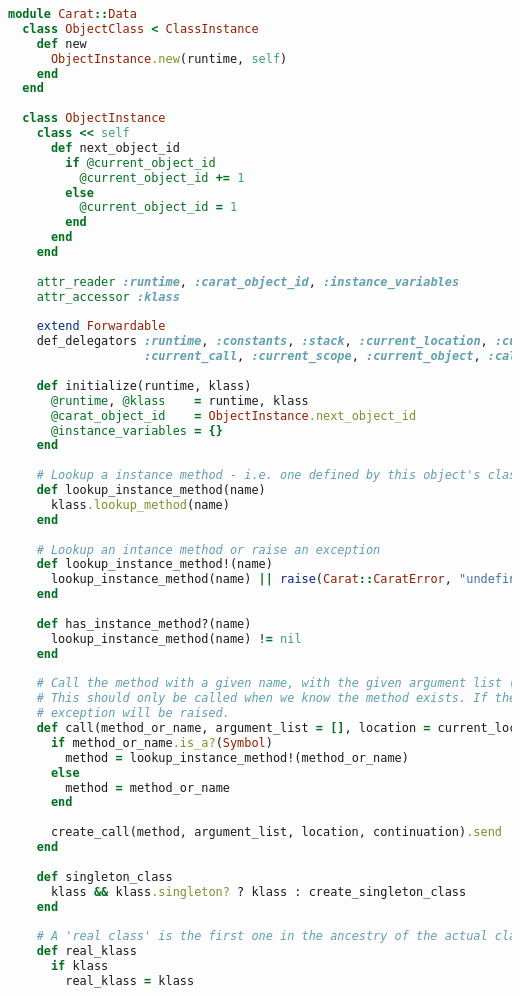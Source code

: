 \begin{lstlisting}[title={\small\ttfamily\bfseries data/object.rb},language=Ruby]
module Carat::Data
  class ObjectClass < ClassInstance
    def new
      ObjectInstance.new(runtime, self)
    end
  end
  
  class ObjectInstance
    class << self
      def next_object_id
        if @current_object_id
          @current_object_id += 1
        else
          @current_object_id = 1
        end
      end
    end
    
    attr_reader :runtime, :carat_object_id, :instance_variables
    attr_accessor :klass
    
    extend Forwardable
    def_delegators :runtime, :constants, :stack, :current_location, :current_failure_continuation,
                   :current_call, :current_scope, :current_object, :call_stack
    
    def initialize(runtime, klass)
      @runtime, @klass    = runtime, klass
      @carat_object_id    = ObjectInstance.next_object_id
      @instance_variables = {}
    end
    
    # Lookup a instance method - i.e. one defined by this object's class
    def lookup_instance_method(name)
      klass.lookup_method(name)
    end
    
    # Lookup an intance method or raise an exception
    def lookup_instance_method!(name)
      lookup_instance_method(name) || raise(Carat::CaratError, "undefined method '#{name}'")
    end
    
    def has_instance_method?(name)
      lookup_instance_method(name) != nil
    end
    
    # Call the method with a given name, with the given argument list (AST::ArgumentList or Array).
    # This should only be called when we know the method exists. If the method does not exist an
    # exception will be raised.
    def call(method_or_name, argument_list = [], location = current_location, &continuation)
      if method_or_name.is_a?(Symbol)
        method = lookup_instance_method!(method_or_name)
      else
        method = method_or_name
      end
      
      create_call(method, argument_list, location, continuation).send
    end
    
    def singleton_class
      klass && klass.singleton? ? klass : create_singleton_class
    end
    
    # A 'real class' is the first one in the ancestry of the actual class, which is not a singleton
    def real_klass
      if klass
        real_klass = klass
        

\end{lstlisting}
